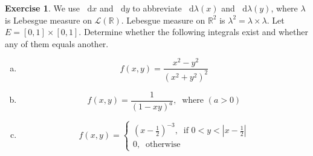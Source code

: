 \documentclass[11pt,oneside]{article}
\numberwithin{equation}{section}
\theoremstyle{definition}
\newtheorem{exercise}{Exercise}
\def\RR{\mathbb{R}}
\def\fancyL{\mathcal{L}}
\newcommand*\diff{\mathop{}\!\mathrm{d}}
\begin{document}
\begin{exercise}
  We use $\diff x$ and $\diff y$ to abbreviate $\diff \lambda(x)$
  and $\diff \lambda(y)$, where $\lambda$ is Lebesgue measure on $\fancyL(\RR)$.
  Lebesgue measure on $\RR^2$ is $\lambda^2 = \lambda \times \lambda$.  Let $E = [0,1 ] \times [0,1]$.
  Determine whether the following integrals exist and whether any of them equals another.
  \begin{enumerate}[(a)]
\item
  \[
  f(x,y) = \frac{x^2 - y^2}{(x^2+y^2)^2}
  \]
\item
  \[
  f(x,y) = \frac{1}{(1-xy)^a}, \ \textrm{ where } (a > 0)
  \]
 \item
   \[
   f(x,y) = \begin{cases}
     (x - \frac{1}{2})^{-3}, \  \textrm{ if } 0 < y < \left| x - \frac{1}{2} \right| \\
     0, \  \textrm{ otherwise }
   \end{cases}
   \]
      
\end{enumerate}
  
\end{exercise}
\end{document}
